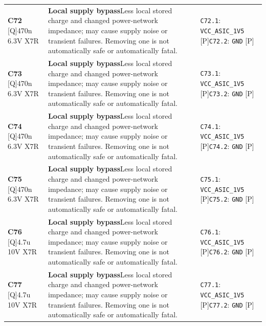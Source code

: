 \documentclass[11pt,a4paper]{article}
\begin{document}
\begin{longtable}{@{}P{27mm}P{77mm}P{62mm}@{}}
\textbf{C72} [Q]\newline 470n 6.3V X7R & \textbf{Local supply bypass}\newline Less local stored charge and changed power-network impedance; may cause supply noise or transient failures. Removing one is not automatically safe or automatically fatal. & \nolinkurl{C72.1}: \nolinkurl{VCC_ASIC_1V5} [P]\newline \nolinkurl{C72.2}: \nolinkurl{GND} [P] \\
\textbf{C73} [Q]\newline 470n 6.3V X7R & \textbf{Local supply bypass}\newline Less local stored charge and changed power-network impedance; may cause supply noise or transient failures. Removing one is not automatically safe or automatically fatal. & \nolinkurl{C73.1}: \nolinkurl{VCC_ASIC_1V5} [P]\newline \nolinkurl{C73.2}: \nolinkurl{GND} [P] \\
\textbf{C74} [Q]\newline 470n 6.3V X7R & \textbf{Local supply bypass}\newline Less local stored charge and changed power-network impedance; may cause supply noise or transient failures. Removing one is not automatically safe or automatically fatal. & \nolinkurl{C74.1}: \nolinkurl{VCC_ASIC_1V5} [P]\newline \nolinkurl{C74.2}: \nolinkurl{GND} [P] \\
\textbf{C75} [Q]\newline 470n 6.3V X7R & \textbf{Local supply bypass}\newline Less local stored charge and changed power-network impedance; may cause supply noise or transient failures. Removing one is not automatically safe or automatically fatal. & \nolinkurl{C75.1}: \nolinkurl{VCC_ASIC_1V5} [P]\newline \nolinkurl{C75.2}: \nolinkurl{GND} [P] \\
\textbf{C76} [Q]\newline 4.7u 10V X7R & \textbf{Local supply bypass}\newline Less local stored charge and changed power-network impedance; may cause supply noise or transient failures. Removing one is not automatically safe or automatically fatal. & \nolinkurl{C76.1}: \nolinkurl{VCC_ASIC_1V5} [P]\newline \nolinkurl{C76.2}: \nolinkurl{GND} [P] \\
\textbf{C77} [Q]\newline 4.7u 10V X7R & \textbf{Local supply bypass}\newline Less local stored charge and changed power-network impedance; may cause supply noise or transient failures. Removing one is not automatically safe or automatically fatal. & \nolinkurl{C77.1}: \nolinkurl{VCC_ASIC_1V5} [P]\newline \nolinkurl{C77.2}: \nolinkurl{GND} [P] \\

\end{longtable}
\end{document}
